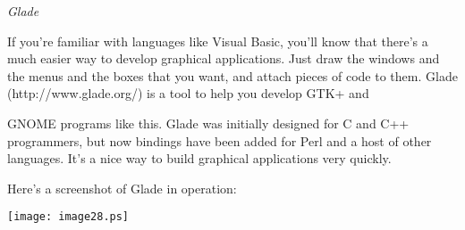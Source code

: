\documentclass[a4paper,11pt]{book}
\begin{document}
\noindent 

\noindent 

\noindent 

\noindent 

\noindent 

\noindent 

\noindent 

\noindent 

\noindent 

\noindent 

\noindent 

\noindent 

\noindent 

\noindent 

\noindent 

\noindent 

\noindent 

\noindent 

\noindent 

\noindent 

\noindent 

\noindent 

\noindent 

\noindent 

\noindent 

\noindent \textit{Glade}

\noindent If you're familiar with languages like Visual Basic, you'll know that there's a much easier way to develop graphical applications. Just draw the windows and the menus and the boxes that you want, and attach pieces of code to them. Glade (http://www.glade.org/) is a tool to help you develop GTK+ and

\noindent GNOME programs like this. Glade was initially designed for C and C++ programmers, but now bindings have been added for Perl and a host of other languages. It's a nice way to build graphical applications very quickly.

\noindent 

\noindent Here's a screenshot of Glade in operation:

\noindent \texttt{[image: image28.ps]}

\noindent 

\noindent 

\noindent 

\noindent 

\noindent 

\noindent 
\end{document}
